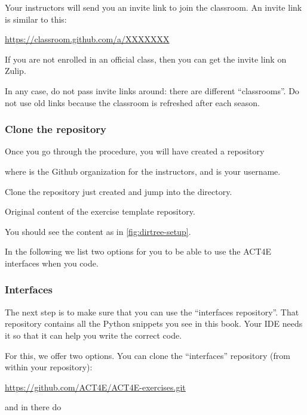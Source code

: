 Your instructors will send you an invite link to join the classroom.
An invite link is similar to this:

\url{https://classroom.github.com/a/XXXXXXX}

If you are not enrolled in an official class, then you can get the invite link on Zulip.

In any case, do not pass invite links around: there are different ``classrooms''.
Do not use old links because the classroom is refreshed after each season.

\subsubsection{Clone the repository}

Once you go through the procedure, you will have created a repository

\begin{quote}
\end{quote}
where  is the Github organization for the instructors, and  is your username.

Clone the repository just created and jump into the directory.

\begin{marginfigure}
    \caption{Original content of the exercise template repository.}
    \label{fig:dirtree-setup}
\end{marginfigure}

You should see the content as in \cref{fig:dirtree-setup}.

In the following we list two options for you to be able to use the ACT4E interfaces when you code.

\subsubsection{Interfaces}

The next step is to make sure that you can use the ``interfaces repository''.
That repository contains all the Python snippets you see in this book.
Your IDE needs it so that it can help you write the correct code.

For this, we offer two options.
You can clone the ``interfaces'' repository (from within your repository):

\url{https://github.com/ACT4E/ACT4E-exercises.git}

and in there do

